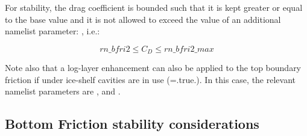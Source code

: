 \documentclass[NEMO_book]{subfiles}
\begin{document}
For stability, the drag coefficient is bounded such that it is kept greater or equal to
the base  value and it is not allowed to exceed the value of an additional
namelist parameter: , i.e.:

\begin{equation}
rn\_bfri2 \leq C_D \leq rn\_bfri2\_max
\end{equation}

\noindent Note also that a log-layer enhancement can also be applied to the top boundary
friction if under ice-shelf cavities are in use (=.true.).  In this case, the
relevant namelist parameters are , 
and .

\subsection{Bottom Friction stability considerations}
\label{ZDF_bfr_stability}
\end{document}
